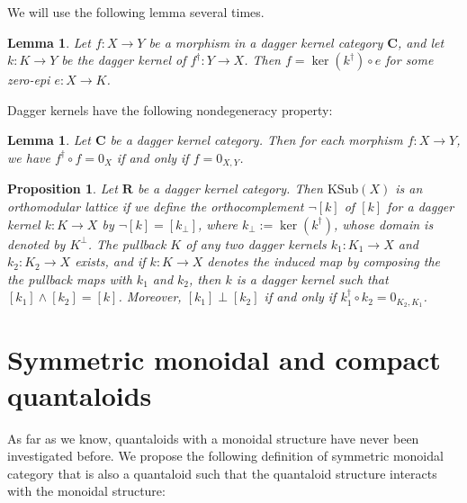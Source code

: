 \documentclass[12pt]{tac}
\newtheorem{lemma}[theorem]{Lemma}
\newtheorem{proposition}[theorem]{Proposition}
\theoremstyle{definition}
\theoremstyle{remark}
\newcommand{\<}{\langle}
\renewcommand{\>}{\rangle}
\renewcommand{\:}{\colon}
\begin{document}
We will use the following lemma several times.
\begin{lemma}\cite[Proposition 7]{heunenjacobs}\label{lem:daggerkernel-zeroepi-factorization}
    Let $f:X\to Y$ be a morphism in a dagger kernel category $\mathbf C$, and let $k:K\to Y$ be the dagger kernel of $f^\dag:Y\to X$. Then $f=\ker(k^\dag)\circ e$ for some zero-epi $e:X\to K$.
\end{lemma}


Dagger kernels have the following nondegeneracy property:

\begin{lemma}\cite[Lemma 2.49]{heunenvicary}\label{lem:nondegeneracy}
Let $\mathbf C$ be a dagger kernel category. Then for each morphism $f:X\to Y$, we have $f^\dag\circ f=0_X$ if and only if $f=0_{X,Y}$.
    \end{lemma}



\begin{proposition}\label{prop:KSub is OML}\cite[Lemma 1, Lemma 2, Proposition 1]{heunenjacobs}
    Let $\mathbf R$ be a dagger kernel category. Then $\mathrm{KSub}(X)$ is an orthomodular lattice if we define the orthocomplement $\neg[k]$ of $[k]$ for a dagger kernel $k:K\to X$ by $\neg [k]=[k_\perp]$, where $k_\perp:=\ker(k^\dag)$, whose domain is denoted by $K^\perp$. The pullback $K$ of any two dagger kernels $k_1:K_1\to X$ and $k_2:K_2\to X$ exists, and if $k:K\to X$ denotes the induced map by composing the  the pullback maps with $k_1$ and $k_2$, then $k$ is a dagger kernel such that $[k_1]\wedge[k_2]=[k]$. Moreover, $[k_1]\perp[k_2]$ if and only if $k_1^\dag\circ k_2=0_{K_2,K_1}$.
\end{proposition}

















\section{Symmetric monoidal and compact quantaloids}\label{sec:monoidal-quantaloids}



As far as we know, quantaloids with a monoidal structure have never been investigated before. We propose the following definition of symmetric monoidal category that is also a quantaloid such that the quantaloid structure interacts with the monoidal structure:
\end{document}
